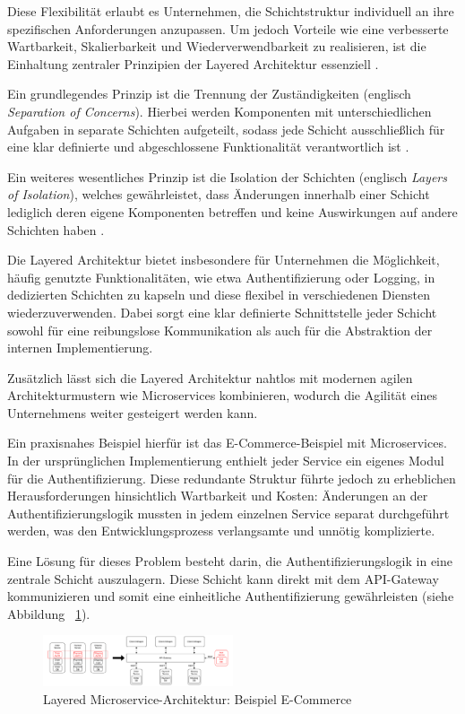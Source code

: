 \documentclass[acmtog]{acmart}
\begin{document}
Diese Flexibilität erlaubt es Unternehmen, die Schichtstruktur individuell an ihre
spezifischen Anforderungen anzupassen. Um jedoch Vorteile wie eine verbesserte Wartbarkeit,
Skalierbarkeit und Wiederverwendbarkeit zu realisieren, ist die Einhaltung zentraler
Prinzipien der Layered Architektur essenziell \cite[34]{layered2}.

Ein grundlegendes Prinzip ist die Trennung der Zuständigkeiten (englisch \textit{Separation
of Concerns}). Hierbei werden Komponenten mit unterschiedlichen Aufgaben in separate Schichten
aufgeteilt, sodass jede Schicht ausschließlich für eine klar definierte und abgeschlossene
Funktionalität verantwortlich ist \cite[34]{layered2}.

Ein weiteres wesentliches Prinzip ist die Isolation der Schichten (englisch \textit{Layers
of Isolation}), welches gewährleistet, dass Änderungen innerhalb einer Schicht lediglich
deren eigene Komponenten betreffen und keine Auswirkungen auf andere Schichten haben \cite[3–4]{architecturePatterns}.

Die Layered Architektur bietet insbesondere für Unternehmen die Möglichkeit, häufig genutzte
Funktionalitäten, wie etwa Authentifizierung oder Logging, in dedizierten Schichten zu kapseln
und diese flexibel in verschiedenen Diensten wiederzuverwenden. Dabei sorgt eine klar definierte
Schnittstelle jeder Schicht sowohl für eine reibungslose Kommunikation als auch für die
Abstraktion der internen Implementierung.

Zusätzlich lässt sich die Layered Architektur nahtlos mit modernen agilen Architekturmustern
wie Microservices kombinieren, wodurch die Agilität eines Unternehmens weiter gesteigert werden
kann.

Ein praxisnahes Beispiel hierfür ist das E-Commerce-Beispiel mit Microservices.
In der ursprünglichen Implementierung enthielt jeder Service ein eigenes Modul für die Authentifizierung. Diese
redundante Struktur führte jedoch zu erheblichen Herausforderungen hinsichtlich Wartbarkeit
und Kosten: Änderungen an der Authentifizierungslogik mussten in jedem einzelnen Service separat
durchgeführt werden, was den Entwicklungsprozess verlangsamte und unnötig komplizierte.

Eine Lösung für dieses Problem besteht darin, die Authentifizierungslogik in eine zentrale
Schicht auszulagern.
Diese Schicht kann direkt mit dem API-Gateway kommunizieren
und somit eine einheitliche Authentifizierung gewährleisten (siehe Abbildung ~\ref{fig:layered}).

\begin{figure}[h!]
  \centering
  \includegraphics[width=0.5\textwidth]{images/layered/ecommerce-example}
  \caption{Layered Microservice-Architektur: Beispiel E-Commerce}
  \label{fig:layered}
\end{figure}
\end{document}
